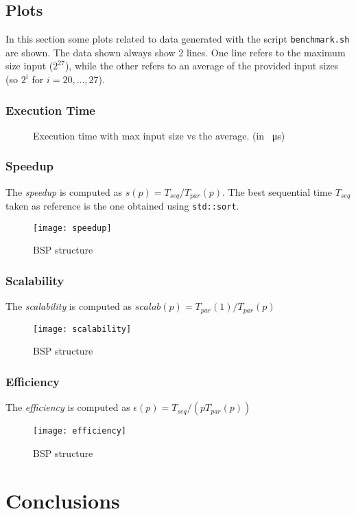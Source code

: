 \documentclass[]{article}
\def\code#1{\texttt{#1}}
\begin{document}
\subsection{Plots}
\label{sec:plots}
In this section some plots related to data generated with the script \code{benchmark.sh} are shown. The data shown always show 2 lines. One line refers to the maximum size input ($2^{27}$), while the other refers to an average of the provided input sizes (so $2^i$ for $i = 20, \dots, 27$).

\subsubsection{Execution Time}
\begin{figure}[H]
	\qquad
	\caption{Execution time with max input size vs the average. (in \SI{}{\micro \second})}
	\label{fig:execution}
\end{figure}

\subsubsection{Speedup}
The \emph{speedup} is computed as $s(p) = T_{seq}/T_{par}(p)$. The best sequential time $T_{seq}$ taken as reference is the one obtained using \code{std::sort}.
\begin{figure}[H]
	\centering
	\texttt{[image: speedup]}
	\caption{BSP structure}
	\label{fig:speedup}
\end{figure}

\subsubsection{Scalability}
The \emph{scalability} is computed as $\mathit{scalab}(p) = T_{par}(1)/T_{par}(p)$
\begin{figure}[H]
	\centering
	\texttt{[image: scalability]}
	\caption{BSP structure}
	\label{fig:scalab}
\end{figure}

\subsubsection{Efficiency}
The \emph{efficiency} is computed as $\epsilon(p) = T_{seq}/(pT_{par}(p))$
\begin{figure}[H]
	\centering
	\texttt{[image: efficiency]}
	\caption{BSP structure}
	\label{fig:effic}
\end{figure}

\section{Conclusions}
\label{sec:conclusion}
\end{document}
